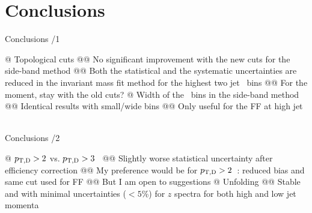 \documentclass[xcolor={usenames,dvipsnames}, aspectratio=169]{beamer}
\begin{document}
\section{Conclusions}

\begin{frame}[fragile]{Conclusions /1}
\begin{easylist}[itemize]
@ Topological cuts
@@ No significant improvement with the new cuts for the side-band method
@@ Both the statistical and the systematic uncertainties are reduced in the invariant mass fit method for the highest two jet \pt\ bins
@@ For the moment, stay with the old cuts?
@ Width of the \ptd\ bins in the side-band method
@@ Identical results with small/wide bins
@@ Only useful for the FF at high jet \pt\
\end{easylist}
\end{frame}

\begin{frame}[fragile]{Conclusions /2}
\begin{easylist}[itemize]
@ $p_{\mathrm{T,D}}>2$ vs. $p_{\mathrm{T,D}}>3$~\GeVc
@@ Slightly worse statistical uncertainty after efficiency correction
@@ My preference would be for $p_{\mathrm{T,D}}>2$~\GeVc: reduced bias and same cut used for FF
@@ But I am open to suggestions
@ Unfolding
@@ Stable and with minimal uncertainties ($<5$\%) for $z$ spectra for both high and low jet momenta
\end{easylist}
\end{frame}
\end{document}
